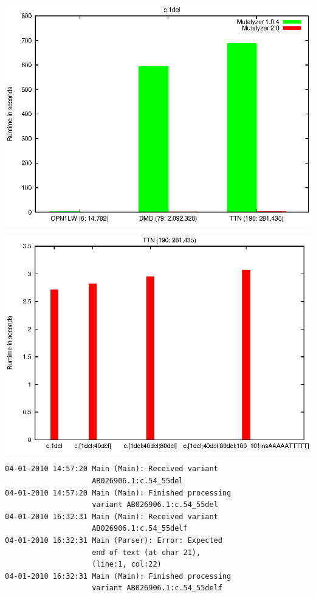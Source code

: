 \documentclass[a4, portrait]{seminar}
\begin{document}
\begin{slide}
\begin{center}
\colorbox{white} {
  \includegraphics[scale = 0.7]{genes}
}
\end{center}
\vfill
\end{slide}

\begin{slide}
\begin{center}
\colorbox{white} {
  \includegraphics[scale = 0.7]{allele}
}
\end{center}
\vfill
\end{slide}

\begin{slide}
\begin{verbatim}
04-01-2010 14:57:20 Main (Main): Received variant 
                    AB026906.1:c.54_55del
04-01-2010 14:57:20 Main (Main): Finished processing 
                    variant AB026906.1:c.54_55del
04-01-2010 16:32:31 Main (Main): Received variant 
                    AB026906.1:c.54_55delf
04-01-2010 16:32:31 Main (Parser): Error: Expected 
                    end of text (at char 21), 
                    (line:1, col:22)
04-01-2010 16:32:31 Main (Main): Finished processing 
                    variant AB026906.1:c.54_55delf
\end{verbatim}
\vfill
\end{slide}
\end{document}

